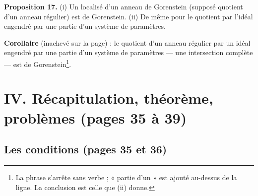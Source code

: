 \documentclass[11pt,a4paper]{article}
\begin{document}
\textbf{Proposition 17.} (i) Un localisé d'un anneau de Gorenstein (supposé
quotient d'un anneau régulier) est de Gorenstein. (ii) De même pour le
quotient par l'idéal engendré par une partie d'un système de paramètres.

\textbf{Corollaire} (inachevé sur la page) : le quotient d'un anneau régulier
par un idéal engendré par une partie d'un système de paramètres --- une
intersection complète --- est de Gorenstein\footnote{La phrase s'arrête sans
verbe ; « partie d'un » est ajouté au-dessus de la ligne. La conclusion est
celle que (ii) donne.}.

\section*{IV. Récapitulation, théorème, problèmes (pages 35 à 39)}

\subsection*{Les conditions (pages 35 et 36)}
\end{document}
